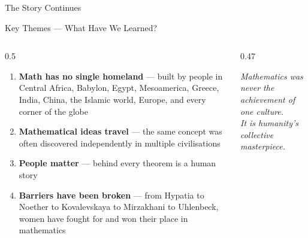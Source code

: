 \begin{frame}[shrink=25]{The Story Continues}
\end{frame}

\begin{frame}[shrink=11]{Key Themes --- What Have We Learned?}

  \begin{columns}[T]
    \begin{column}{0.5\textwidth}
      \begin{enumerate}\setlength\itemsep{6pt}
        \item[\textcolor{aiViolet}{\faGlobeAmericas}]
          \textbf{Math has no single homeland} --- built by people in Central
          Africa, Babylon, Egypt, Mesoamerica, Greece, India, China, the
          Islamic world, Europe, and every corner of the globe

        \item[\textcolor{aiViolet}{\faArrowsAltH}]
          \textbf{Mathematical ideas travel} --- the same concept was often
          discovered independently in multiple civilisations

        \item[\textcolor{aiViolet}{\faUser}]
          \textbf{People matter} --- behind every theorem is a human story

        \item[\textcolor{aiViolet}{\faFistRaised}]
          \textbf{Barriers have been broken} --- from Hypatia to Noether to
          Kovalevskaya to Mirzakhani to Uhlenbeck, women have fought for
          and won their place in mathematics
      \end{enumerate}
    \end{column}

    \begin{column}{0.47\textwidth}

      \vspace{0.2em}
      \begin{center}
        {\scriptsize\itshape Mathematics was never the achievement of one culture.\\
        It is humanity's collective masterpiece.}
      \end{center}
    \end{column}
  \end{columns}


\end{frame}
